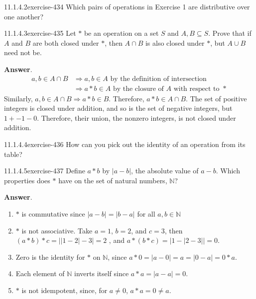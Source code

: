 \documentclass[twoside,10pt,]{book}
\numberwithin{equation}{section}
\begin{document}
\begin{divisionsolution}{11.1.4.2}{}{exercise-434}%
\hypertarget{p-3807}{}%
Which pairs of operations in Exercise 1 are distributive over one another?%
\end{divisionsolution}%
\begin{divisionsolution}{11.1.4.3}{}{exercise-435}%
\hypertarget{p-3808}{}%
Let \(*\) be an operation on a set \(S\) and \(A, B \subseteq S\). Prove that if \(A\) and \(B\) are both closed under \(*\), then \(A\cap B\) is also closed under \(*\), but \(A \cup  B\) need not be.%
\par\smallskip%
\noindent\textbf{Answer}.\quad%
\hypertarget{p-3809}{}%
%
\begin{equation*}
\begin{split}
a, b \in  A \cap  B & \Rightarrow a, b \in  A \textrm{     by the definition of intersection}\\
& \Rightarrow  a*b \in A\textrm{      by the closure of } A \textrm{ with respect  to } *
\end{split}
\end{equation*}
Similarly, \(a, b \in  A \cap B \Rightarrow  a*b \in B\). Therefore, \(a * b \in  A \cap  B\). The set of positive integers is closed under addition, and so is the set of negative integers, but \(1 + -1 - 0\). Therefore, their union, the nonzero integers, is not closed under addition.%
\end{divisionsolution}%
\begin{divisionsolution}{11.1.4.4}{}{exercise-436}%
\hypertarget{p-3810}{}%
How can you pick out the identity of an operation from its table?%
\end{divisionsolution}%
\begin{divisionsolution}{11.1.4.5}{}{exercise-437}%
\hypertarget{p-3811}{}%
Define \(a * b\) by \(\lvert a - b \rvert\), the absolute value of \(a - b\). Which properties does \(*\) have on the set of natural numbers, \(\mathbb{N}\)?%
\par\smallskip%
\noindent\textbf{Answer}.\quad%
\hypertarget{p-3812}{}%
\leavevmode%
\begin{enumerate}[label=(\alph*)]
\item\hypertarget{li-1743}{}\hypertarget{p-3813}{}%
\(*\) is commutative since \(\left| a-b\right| =\left| b-a\right|\) for all \(a, b \in  \mathbb{N}\)%
\item\hypertarget{li-1744}{}\hypertarget{p-3814}{}%
\(*\) is not associative. Take \(a = 1\), \(b = 2\), and \(c = 3\), then \((a * b) * c =\left| \left| 1-2\right| -3\right| =2\) , and \(a * (b * c) = \left| 1-\left| 2-3\right| \right| = 0\).%
\item\hypertarget{li-1745}{}\hypertarget{p-3815}{}%
Zero is the identity for \(*\) on \(\mathbb{N}\), since \(a*0=\left| a - 0\right|  = a = \left| 0-a\right| = 0 * a.\)%
\item\hypertarget{li-1746}{}\hypertarget{p-3816}{}%
Each element of \(\mathbb{N}\) inverts itself since \(a * a=\left| a-a\right|  = 0\).%
\item\hypertarget{li-1747}{}\hypertarget{p-3817}{}%
\(*\) is not idempotent, since, for \(a\neq 0\), \(a * a =0 \neq a\).%
\end{enumerate}
%
\end{divisionsolution}%
\end{document}
